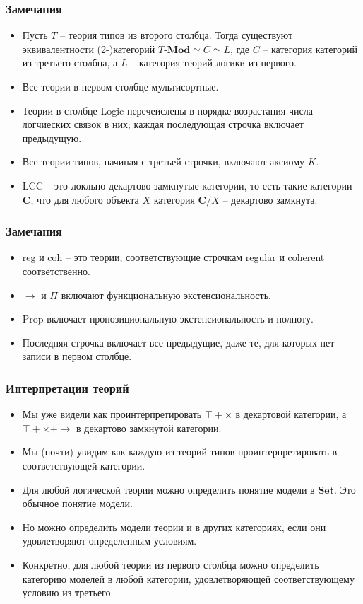 \documentclass{beamer}
\theoremstyle{definition}
\newcommand{\cat}[1]{\mathbf{#1}}
\renewcommand{\C}{\cat{C}}
\newcommand{\Set}{\cat{Set}}
\newcommand{\Mod}[1]{#1\text{-}\cat{Mod}}
\newcommand{\fs}[1]{\mathrm{#1}}
\begin{document}
\begin{frame}
\frametitle{Замечания}
\begin{itemize}
\item Пусть $T$ -- теория типов из второго столбца.
Тогда существуют эквивалентности (2-)категорий $\Mod{T} \simeq C \simeq L$, где $C$ -- категория категорий из третьего столбца, а $L$ -- категория теорий логики из первого.
\item Все теории в первом столбце мультисортные.
\item Теории в столбце Logic перечеислены в порядке возрастания числа логчиеских связок в них; каждая последующая строчка включает предыдущую.
\item Все теории типов, начиная с третьей строчки, включают аксиому $K$.
\item LCC -- это локльно декартово замкнутые категории, то есть такие категории $\C$, что для любого объекта $X$ категория $\C/X$ -- декартово замкнута.
\end{itemize}
\end{frame}

\begin{frame}
\frametitle{Замечания}
\begin{itemize}
\item reg и coh -- это теории, соответствующие строчкам regular и coherent соответственно.
\item $\to$ и $\Pi$ включают функциональную экстенсиональность.
\item $\fs{Prop}$ включает пропозициональную экстенсиональность и полноту.
\item Последняя строчка включает все предыдущие, даже те, для которых нет записи в первом столбце.
\end{itemize}
\end{frame}

\begin{frame}
\frametitle{Интерпретации теорий}
\begin{itemize}
\item Мы уже видели как проинтерпретировать $\top + \times$ в декартовой категории, а $\top + \times + \to$ в декартово замкнутой категории.
\item Мы (почти) увидим как каждую из теорий типов проинтерпретировать в соответствующей категории.
\item Для любой логической теории можно определить понятие модели в $\Set$. Это обычное понятие модели.
\item Но можно определить модели теории и в других категориях, если они удовлетворяют определенным условиям.
\item Конкретно, для любой теории из первого столбца можно определить категорию моделей в любой категории, удовлетворяющей соответствующему условию из третьего.
\end{itemize}
\end{frame}
\end{document}
